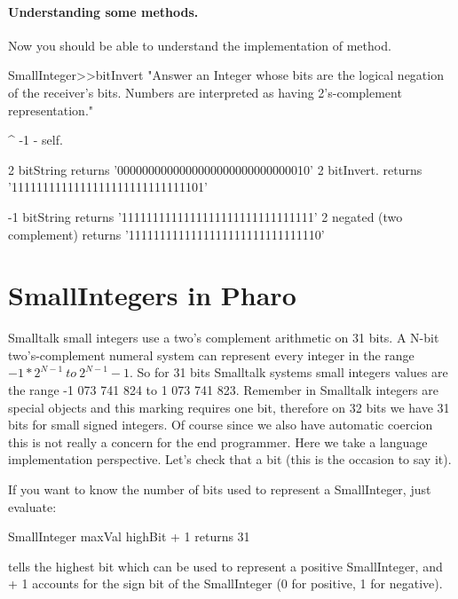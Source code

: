 \documentclass[a4paper,10pt,twoside]{book}
\begin{document}
\paragraph{Understanding some methods.}
Now you should be able to understand the implementation of  method.

\begin{code}{}
SmallInteger>>bitInvert
    "Answer an Integer whose bits are the logical negation of the receiver's bits.
    Numbers are interpreted as having 2's-complement representation."

	^ -1 - self.
\end{code}

\begin{code}{}
2 bitString
	returns '0000000000000000000000000000010'
2 bitInvert.
	returns '1111111111111111111111111111101'
	
-1 bitString
	returns '1111111111111111111111111111111'
2 negated (two complement)
	returns '1111111111111111111111111111110'
\end{code}


\section{SmallIntegers in Pharo}

Smalltalk small integers use a two's complement arithmetic on 31 bits.  A N-bit two's-complement numeral system can represent every integer in the range $-1 * 2^{N-1}\ to\ 2^{N-1}-1$. So for 31 bits Smalltalk systems small integers values are the range -1 073 741 824 to  1 073 741 823.  Remember in Smalltalk integers are special objects and this marking requires one bit, therefore on 32 bits we have 31 bits for small signed integers. Of course since we also have automatic coercion this is not really a concern for the end programmer. Here we take a language implementation perspective.
 Let's check that a bit (this is the occasion to say it). 

If you want to know the number of bits used to represent a
SmallInteger, just evaluate:

\begin{code}{}
SmallInteger maxVal highBit + 1
	returns 31
\end{code}

 tells the highest bit which can be used to
represent a positive SmallInteger, and + 1 accounts for the sign bit
of the SmallInteger (0 for positive, 1 for negative).
\end{document}

